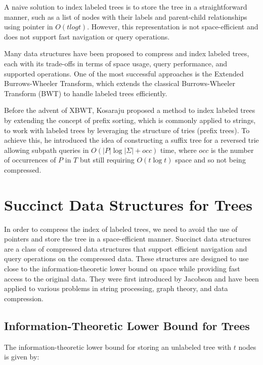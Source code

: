 A naive solution to index labeled trees is to store the tree in a straightforward manner, such as a list of nodes with their labels and parent-child relationships using pointer in $O(t log t)$. However, this representation is not space-efficient and does not support fast navigation or query operations. 

Many data structures have been proposed to compress and index labeled trees, each with its trade-offs in terms of space usage, query performance, and supported operations. One of the most successful approaches is the Extended Burrows-Wheeler Transform, which extends the classical Burrows-Wheeler Transform (BWT) to handle labeled trees efficiently. 

Before the advent of XBWT, Kosaraju \cite{kosaraju1989efficient} proposed a method to index labeled trees by extending the concept of prefix sorting, which is commonly applied to strings, to work with labeled trees by leveraging the structure of tries (prefix trees). To achieve this, he introduced the idea of constructing a suffix tree for a reversed trie allowing subpath queries in $O(|P|\log|\Sigma|+ occ)$ time, where $occ$ is the number of occurrences of $P$ in $T$ but still requiring $O(t \log t)$ space and so not being compressed.

\section{Succinct Data Structures for Trees}
In order to compress the index of labeled trees, we need to avoid the use of pointers and store the tree in a space-efficient manner. Succinct data structures are a class of compressed data structures that support efficient navigation and query operations on the compressed data. These structures are designed to use close to the information-theoretic lower bound on space while providing fast access to the original data. They were first introduced by Jacobson \cite{jacobson1989space} and have been applied to various problems in string processing, graph theory, and data compression.

\subsection{Information-Theoretic Lower Bound for Trees}
The information-theoretic lower bound for storing an unlabeled tree with $t$ nodes is given by:

